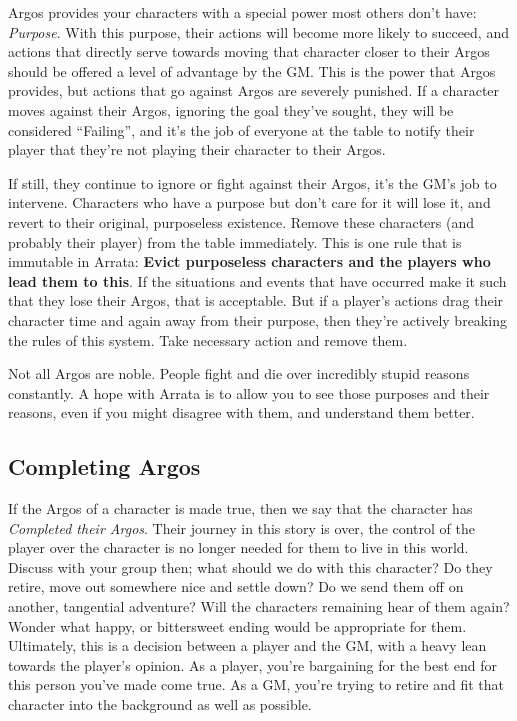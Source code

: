\documentclass[../main.tex]{subfiles}
\begin{document}
        Argos provides your characters with a special power most others don't have: \emph{Purpose}. With this purpose, their actions will become more likely to succeed, and actions that directly serve towards moving that character closer to their Argos should be offered a level of advantage by the GM. This is the power that Argos provides, but actions that go against Argos are severely punished. If a character moves against their Argos, ignoring the goal they've sought, they will be considered ``Failing'', and it's the job of everyone at the table to notify their player that they're not playing their character to their Argos.

        If still, they continue to ignore or fight against their Argos, it's the GM's job to intervene. Characters who have a purpose but don't care for it will lose it, and revert to their original, purposeless existence. Remove these characters (and probably their player) from the table immediately. This is one rule that is immutable in Arrata: \textbf{Evict purposeless characters and the players who lead them to this}. If the situations and events that have occurred make it such that they lose their Argos, that is acceptable. But if a player's actions drag their character time and again away from their purpose, then they're actively breaking the rules of this system. Take necessary action and remove them.

        Not all Argos are noble. People fight and die over incredibly stupid reasons constantly. A hope with Arrata is to allow you to see those purposes and their reasons, even if you might disagree with them, and understand them better.

    \subsection{Completing Argos}

        If the Argos of a character is made true, then we say that the character has \emph{Completed their Argos}. Their journey in this story is over, the control of the player over the character is no longer needed for them to live in this world. Discuss with your group then; what should we do with this character? Do they retire, move out somewhere nice and settle down? Do we send them off on another, tangential adventure? Will the characters remaining hear of them again? Wonder what happy, or bittersweet ending would be appropriate for them. Ultimately, this is a decision between a player and the GM, with a heavy lean towards the player's opinion. As a player, you're bargaining for the best end for this person you've made come true. As a GM, you're trying to retire and fit that character into the background as well as possible.
\end{document}
